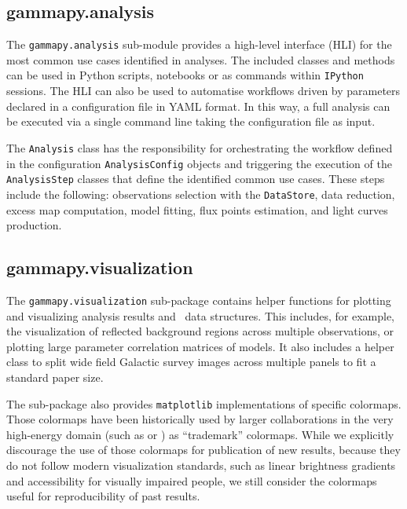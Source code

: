 \documentclass[longauth]{aa}
\newcommand{\code}[1]{\texttt{#1}}
\begin{document}
\subsection{gammapy.analysis}
\label{ssec:gammapy-analysis}
The \code{gammapy.analysis} sub-module provides a high-level interface (HLI) for the most
common use cases identified in \gammaray analyses. The included classes and methods
 can be used in Python scripts, notebooks or as commands within \texttt{IPython}
sessions. The HLI can also be used to automatise
workflows driven by parameters declared in a configuration file in YAML format.
In this way, a full analysis can be executed via a single command line taking the
configuration file as input.

The \code{Analysis} class has the responsibility for orchestrating the workflow
defined in the configuration \code{AnalysisConfig} objects and triggering the execution of
the \code{AnalysisStep} classes that define the identified common use cases. These
steps include the following: observations selection with the \code{DataStore},  data
reduction, excess map computation, model fitting, flux points estimation, and
light curves production.

\subsection{gammapy.visualization}
\label{ssec:gammapy-visualization}
The \code{gammapy.visualization} sub-package contains helper functions
for plotting and visualizing analysis results and \gammapy~data structures.
This includes, for example, the visualization of reflected background regions across
multiple observations, or plotting large parameter correlation matrices of
\gammapy models. It also includes a helper class to split
wide field Galactic survey images across multiple panels to fit a standard
paper size.

The sub-package also provides \texttt{matplotlib} implementations of specific
colormaps. Those colormaps have been historically used by larger collaborations
in the very high-energy domain (such as \milagro or \hess) as \enquote{trademark}
colormaps. While we explicitly discourage the use of those colormaps for publication
of new results, because they do not follow modern visualization
standards, such as linear brightness gradients and accessibility
for visually impaired people, we still consider the colormaps
useful for reproducibility of past results.
\end{document}
